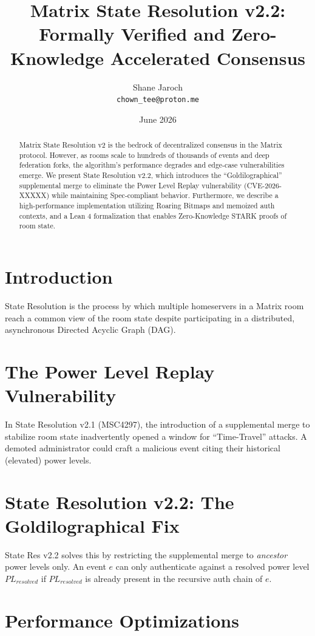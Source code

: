 \documentclass[11pt,a4paper]{article}
\title{Matrix State Resolution v2.2: \\ Formally Verified and Zero-Knowledge Accelerated Consensus}
\author{Shane Jaroch \\ \texttt{chown\_tee@proton.me}}
\date{June 2026}
\begin{document}
\maketitle

\begin{abstract}
Matrix State Resolution v2 is the bedrock of decentralized consensus in the Matrix protocol. However, as rooms scale to hundreds of thousands of events and deep federation forks, the algorithm's performance degrades and edge-case vulnerabilities emerge. We present State Resolution v2.2, which introduces the ``Goldilographical'' supplemental merge to eliminate the Power Level Replay vulnerability (CVE-2026-XXXXX) while maintaining Spec-compliant behavior. Furthermore, we describe a high-performance implementation utilizing Roaring Bitmaps and memoized auth contexts, and a Lean 4 formalization that enables Zero-Knowledge STARK proofs of room state.
\end{abstract}

\section{Introduction}
State Resolution is the process by which multiple homeservers in a Matrix room reach a common view of the room state despite participating in a distributed, asynchronous Directed Acyclic Graph (DAG).

\section{The Power Level Replay Vulnerability}
In State Resolution v2.1 (MSC4297), the introduction of a supplemental merge to stabilize room state inadvertently opened a window for ``Time-Travel'' attacks. A demoted administrator could craft a malicious event citing their historical (elevated) power levels.

\section{State Resolution v2.2: The Goldilographical Fix}
State Res v2.2 solves this by restricting the supplemental merge to \textit{ancestor} power levels only. An event $e$ can only authenticate against a resolved power level $PL_{resolved}$ if $PL_{resolved}$ is already present in the recursive auth chain of $e$.

\section{Performance Optimizations}
\end{document}
